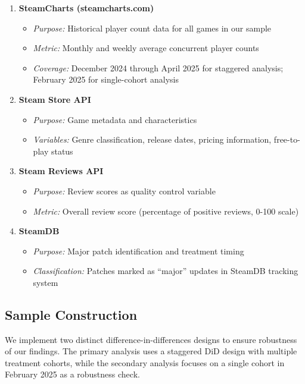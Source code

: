 \documentclass[12pt,a4paper]{article}
\begin{document}
\begin{enumerate}[leftmargin=*]
    \item \textbf{SteamCharts (steamcharts.com)}
    \begin{itemize}
        \item \textit{Purpose:} Historical player count data for all games in our sample
        \item \textit{Metric:} Monthly and weekly average concurrent player counts
        \item \textit{Coverage:} December 2024 through April 2025 for staggered analysis; February 2025 for single-cohort analysis
    \end{itemize}
    
    \item \textbf{Steam Store API}
    \begin{itemize}
        \item \textit{Purpose:} Game metadata and characteristics
        \item \textit{Variables:} Genre classification, release dates, pricing information, free-to-play status
    \end{itemize}
    
    \item \textbf{Steam Reviews API}
    \begin{itemize}
        \item \textit{Purpose:} Review scores as quality control variable
        \item \textit{Metric:} Overall review score (percentage of positive reviews, 0-100 scale)
    \end{itemize}
    
    \item \textbf{SteamDB}
    \begin{itemize}
        \item \textit{Purpose:} Major patch identification and treatment timing
        \item \textit{Classification:} Patches marked as ``major'' updates in SteamDB tracking system
    \end{itemize}
\end{enumerate}

\subsection{Sample Construction}

We implement two distinct difference-in-differences designs to ensure robustness of our findings. The primary analysis uses a staggered DiD design with multiple treatment cohorts, while the secondary analysis focuses on a single cohort in February 2025 as a robustness check.
\end{document}
